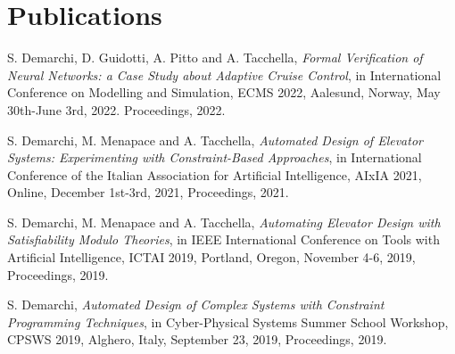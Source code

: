 \section{\sc Publications}

S. Demarchi, D. Guidotti, A. Pitto and A. Tacchella, \textit{Formal
	 Verification of Neural Networks: a Case Study about Adaptive 
	 Cruise Control}, in International Conference on Modelling and
Simulation, ECMS 2022, Aalesund, Norway, May 30th-June 3rd, 2022.
Proceedings, 2022.

 
S. Demarchi, M. Menapace and A. Tacchella, \textit{Automated Design 
	of Elevator Systems: Experimenting with Constraint-Based 
	Approaches}, in International Conference of the Italian 
Association for Artificial Intelligence, AIxIA 2021, Online, 
December 1st-3rd, 2021, Proceedings, 2021.

S. Demarchi, M. Menapace and A. Tacchella, \textit{Automating Elevator 
	Design with Satisfiability Modulo Theories}, in IEEE International 
Conference on Tools with Artificial Intelligence, ICTAI 2019, Portland, 
Oregon, November 4-6, 2019, Proceedings, 2019.

S. Demarchi, \textit{Automated Design of Complex Systems with Constraint 
	Programming Techniques}, in Cyber-Physical Systems Summer School 
Workshop, CPSWS 2019, Alghero, Italy, September 23, 2019, Proceedings, 
2019.